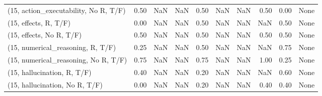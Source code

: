 \begin{table*}[h!]
\begin{adjustbox}{width=2\columnwidth,center}
\begin{tabular}{lrrr|rrr|rrr}
(15, action\_executability, No R, T/F) &                      0.50 &                   NaN &                       NaN &                          0.50 &                       NaN &                           NaN &                                   0.50 &                               0.00 &                                  None \\
(15, effects, R, T/F)                 &                      0.00 &                   NaN &                       NaN &                          0.50 &                       NaN &                           NaN &                                    NaN &                               0.50 &                                  None \\
(15, effects, No R, T/F)              &                      0.50 &                   NaN &                       NaN &                          0.50 &                       NaN &                           NaN &                                   0.50 &                               0.50 &                                  None \\
(15, numerical\_reasoning, R, T/F)     &                      0.25 &                   NaN &                       NaN &                          0.50 &                       NaN &                           NaN &                                    NaN &                               0.75 &                                  None \\
(15, numerical\_reasoning, No R, T/F)  &                      0.75 &                   NaN &                       NaN &                          0.75 &                       NaN &                           NaN &                                   1.00 &                               0.25 &                                  None \\
(15, hallucination, R, T/F)           &                      0.40 &                   NaN &                       NaN &                          0.20 &                       NaN &                           NaN &                                    NaN &                               0.60 &                                  None \\
(15, hallucination, No R, T/F)        &                      0.00 &                   NaN &                       NaN &                          0.20 &                       NaN &                           NaN &                                   0.40 &                               0.40 &                                  None \\

\end{tabular}
\end{adjustbox}
\end{table*}
